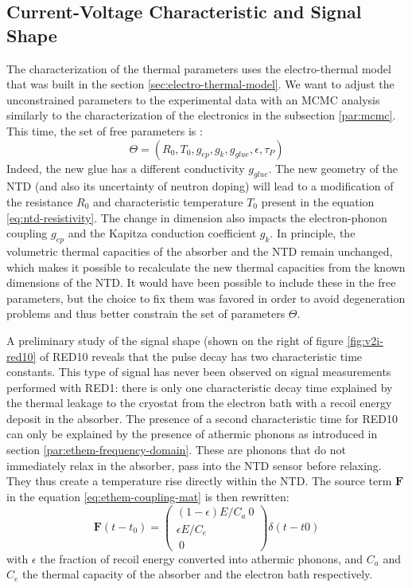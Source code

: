 \subsection{Current-Voltage Characteristic and Signal Shape}

The characterization of the thermal parameters uses the electro-thermal model that was built in the section \ref{sec:electro-thermal-model}. We want to adjust the unconstrained parameters to the experimental data with an MCMC analysis similarly to the characterization of the electronics in the subsection \ref{par:mcmc}. This time, the set of free parameters is :
\begin{equation}
\Theta = (R_0, T_0, g_{ep}, g_k, g_{glue}, \epsilon, \tau_P)
\label{theta-red10}
\end{equation}
Indeed, the new glue has a different conductivity $g_{glue}$. The new geometry of the NTD (and also its uncertainty of neutron doping) will lead to a modification of the resistance $R_0$ and characteristic temperature $T_0$ present in the equation \ref{eq:ntd-resistivity}. The change in dimension also impacts the electron-phonon coupling $g_{ep}$ and the Kapitza conduction coefficient $g_k$. In principle, the volumetric thermal capacities of the absorber and the NTD remain unchanged, which makes it possible to recalculate the new thermal capacities from the known dimensions of the NTD. It would have been possible to include these in the free parameters, but the choice to fix them was favored in order to avoid degeneration problems and thus better constrain the set of parameters $\Theta$.

A preliminary study of the signal shape (shown on the right of figure \ref{fig:v2i-red10} of RED10 reveals that the pulse decay has two characteristic time constants. This type of signal has never been observed on signal measurements performed with RED1: there is only one characteristic decay time explained by the thermal leakage to the cryostat from the electron bath with a recoil energy deposit in the absorber. The presence of a second characteristic time for RED10 can only be explained by the presence of athermic phonons as introduced in section \ref{par:ethem-frequency-domain}. These are phonons that do not immediately relax in the absorber, pass into the NTD sensor before relaxing. They thus create a temperature rise directly within the NTD. The source term $\bm{F}$ in the equation \ref{eq:ethem-coupling-mat} is then rewritten:
\begin{equation}
\bm{F}(t-t_0) = 
\left( \begin{array}{c}
(1-\epsilon)E/C_a \
0 \\
\epsilon E/C_e \\\
0
\end{array} \right) \delta (t-t0)
\end{equation}
with $\epsilon$ the fraction of recoil energy converted into athermic phonons, and $C_a$ and $C_e$ the thermal capacity of the absorber and the electron bath respectively.

